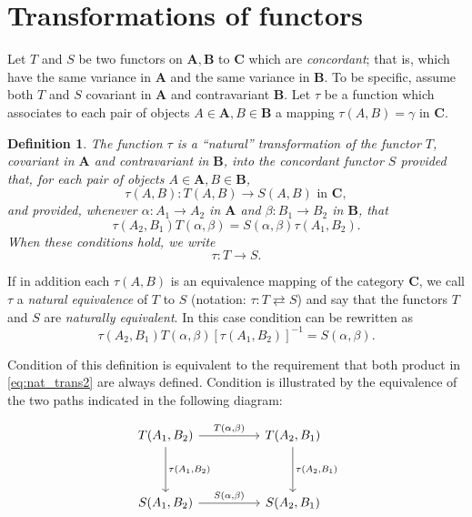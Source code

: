 \documentclass[11pt,a4paper]{report}
\newtheorem*{thdef}{Definition}
\begin{document}
\section{Transformations of functors}\label{sec:nat_tra}
Let $T$ and $S$ be two functors on $\mathbf{A,B}$ to $\mathbf{C}$ which are \emph{concordant}; that is,
which have the same variance in $\mathbf{A}$ and the same variance in $\mathbf{B}$. To be specific,
assume both $T$ and $S$ covariant in $\mathbf{A}$ and contravariant $\mathbf{B}$. Let $\tau$ be a
function which associates to each pair of objects $A\in\mathbf{A},B\in\mathbf{B}$ a mapping 
$\tau(A,B)=\gamma$ in $\mathbf{C}$.
\begin{thdef}
	The function $\tau$ is a ``natural'' transformation of the functor $T$, covariant in $\mathbf{A}$
	and contravariant in $\mathbf{B}$, into the concordant functor $S$ provided that, for each pair
	of objects $A\in\mathbf{A},B\in\mathbf{B}$,
	\begin{equation}\label{eq:nat_trans}
		\tau(A,B): T(A,B)\rightarrow S(A,B)\text{ in }\mathbf{C},
	\end{equation}
	and provided, whenever $\alpha:A_1\rightarrow A_2$ in $\mathbf{A}$ and $\beta:B_1\rightarrow B_2$
	in $\mathbf{B}$, that
	\begin{equation}\label{eq:nat_trans2}
		\tau(A_2,B_1) T(\alpha,\beta) = S(\alpha,\beta)\tau(A_1,B_2).
	\end{equation}
	When these conditions hold, we write
	\begin{equation*}
		\tau:T\rightarrow S.
	\end{equation*}
\end{thdef}
If in addition each $\tau(A,B)$ is an equivalence mapping of the category $\mathbf{C}$, we call $\tau$ a
\emph{natural equivalence} of $T$ to $S$ (notation: $\tau: T\rightleftarrows S$) and say that the functors
$T$ and $S$ are \emph{naturally equivalent}. In this case condition  can be rewritten as
\begin{equation}\label{eq:nat_eq}
	\tau(A_2,B_1) T(\alpha,\beta){[\tau(A_1,B_2)]}^{-1}= S(\alpha,\beta).
\end{equation}

Condition  of this definition is equivalent to the requirement that both product in \cref{eq:nat_trans2}
are always defined. Condition  is illustrated by the equivalence
of the two paths indicated in the following diagram:
\begin{equation*}
\begin{tikzpicture}
	\node (a) at (0,0)
	{ \begin{tikzcd}[sep=huge]
		T({A_1,B_2}) \arrow[r,"{T(\alpha,\beta)}"] \arrow[d, "{\tau(A_1,B_2)}"] & T(A_2,B_1) 
		\arrow[d,"{\tau(A_2,B_1)}"] \\
		S(A_1,B_2) \arrow[r,"{S(\alpha,\beta)}"] & S(A_2,B_1)
	\end{tikzcd}};
\end{tikzpicture}
\end{equation*}
\end{document}
